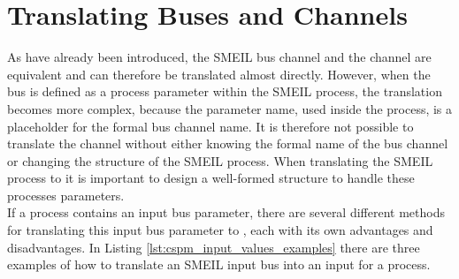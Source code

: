 \section{Translating Buses and Channels}
As have already been introduced, the SMEIL bus channel and the \cspm{} channel are equivalent and can therefore be translated almost directly. However, when the bus is defined as a process parameter within the SMEIL process, the translation becomes more complex, because the parameter name, used inside the process, is a placeholder for the formal bus channel name. It is therefore not possible to translate the channel without either knowing the formal name of the bus channel or changing the structure of the SMEIL process.
When translating the SMEIL process to \cspm{} it is important to design a well-formed structure to handle these processes parameters.\\

If a process contains an input bus parameter, there are several different methods for translating this input bus parameter to \cspm{}, each with its own advantages and disadvantages.
In Listing \ref{lst:cspm_input_values_examples} there are three \cspm{} examples of how to translate an SMEIL input bus into an input for a \cspm{} process.\\

